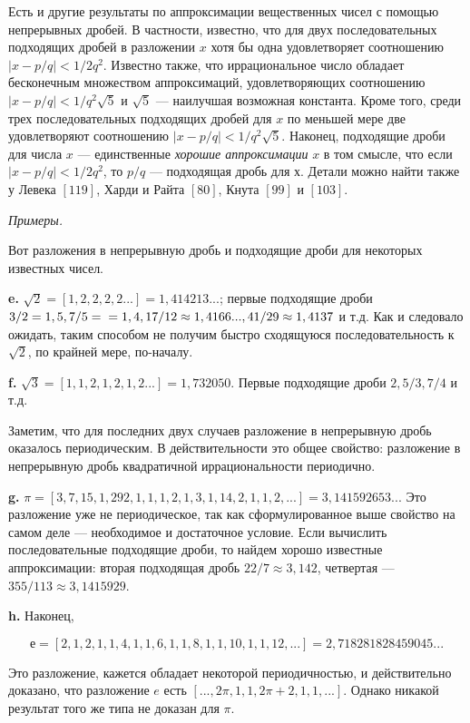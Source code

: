 \begin{mynotice}
Есть и другие результаты по аппроксимации вещественных чисел
с помощью непрерывных дробей. В частности, известно, что для двух
последовательных подходящих дробей в разложении $x$ хотя бы одна
удовлетворяет соотношению $|x-p/q| < 1/2q^2$. Известно также, что
иррациональное число обладает бесконечным множеством 
аппроксимаций, удовлетворяющих соотношению $|x-p/q| < 1/q^2 \sqrt{5}$ и $\sqrt{5}$ — наилучшая возможная константа. Кроме того, среди трех последовательных подходящих дробей для $x$ по меньшей мере две удовлетворяют 
соотношению $|x-p/q| < 1/q^2 \sqrt{5}$. Наконец, подходящие дроби для числа
$x$ — единственные \textit{хорошие аппроксимации} $x$ в том смысле, что если
$|x-p/q| < 1/2q^2$, то $p/q$ — подходящая дробь для $х$. Детали можно
найти также у Левека $[119]$, Харди и Райта $[80]$, Кнута $[99]$ и $[103]$.
\end{mynotice}

\noindent \textit{Примеры.}

Вот разложения в непрерывную дробь и подходящие дроби для 
некоторых известных чисел.

\textbf{e.} $\sqrt{2} = [1,2,2,2,2...] = 1,414213...$; первые подходящие дроби $3/2 = 1,5, 7/5 = \\ = 1,4, 17/12 \approx 1,4166..., 41/29 \approx 1,4137$ и т.д. Как и следовало ожидать, таким способом не получим быстро сходящуюся
последовательность к $\sqrt{2}$, по крайней мере, по-началу.

\textbf{f.} $\sqrt{3} = [1,1,2,1,2,1,2...] = 1,732050$. Первые подходящие дроби $2, 5/3, 7/4$ и т.д.

Заметим, что для последних двух случаев разложение в непрерывную дробь оказалось периодическим. В действительности это общее свойство: разложение в непрерывную дробь квадратичной иррациональности периодично.

\textbf{g.} $\pi = [3,7,15,1,292,1,1,1,2,1,3,1,14,2,1,1,2,...] = 3,141592653...$ Это разложение уже не периодическое, так как сформулированное 
выше свойство на самом деле — необходимое и достаточное условие. Если вычислить последовательные подходящие дроби, то найдем хорошо известные аппроксимации: вторая подходящая дробь $22/7 \approx 3,142$, 
четвертая — $355/113 \approx 3,1415929$.

\textbf{h.} Наконец,

\[
е = [2,1,2,1,1,4,1,1,6,1,1,8,1,1,10,1,1,12,...] = 2,718 281828459045...
\]

\noindent Это разложение, кажется обладает некоторой периодичностью, и 
действительно доказано, что разложение $e$ есть $[...,2\pi,1,1,2\pi+2,1,1,...]$. Однако никакой результат того же типа не доказан для $\pi$.
\\

